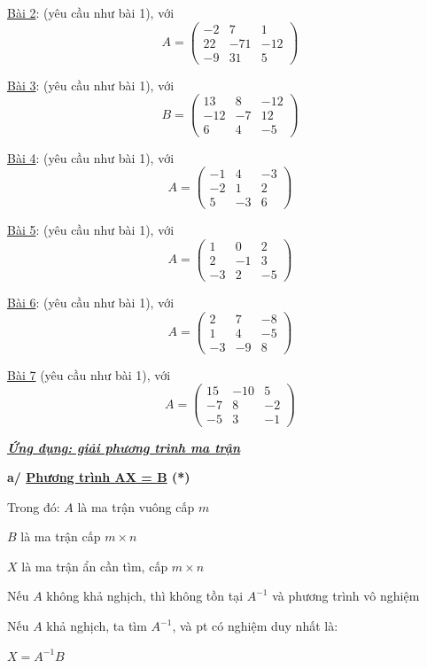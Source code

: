 \documentclass[
]{article}
\let\ul\uline
\begin{document}
\ul{Bài 2}: (yêu cầu như bài 1), với
$$A = \begin{pmatrix} -2 & 7 & 1 \\ 22 & -71 & -12 \\ -9 & 31 & 5 \end{pmatrix}$$

\ul{Bài 3}: (yêu cầu như bài 1), với
$$B = \begin{pmatrix} 13 & 8 & -12 \\ -12 & -7 & 12 \\ 6 & 4 & -5 \end{pmatrix}$$

\ul{Bài 4}: (yêu cầu như bài 1), với
$$A = \begin{pmatrix} -1 & 4 & -3 \\ -2 & 1 & 2 \\ 5 & -3 & 6 \end{pmatrix}$$

\ul{Bài 5}: (yêu cầu như bài 1), với
$$A = \begin{pmatrix} 1 & 0 & 2 \\ 2 & -1 & 3 \\ -3 & 2 & -5 \end{pmatrix}$$

\ul{Bài 6}: (yêu cầu như bài 1), với
$$A = \begin{pmatrix} 2 & 7 & -8 \\ 1 & 4 & -5 \\ -3 & -9 & 8 \end{pmatrix}$$

\ul{Bài 7} (yêu cầu như bài 1), với
$$A = \begin{pmatrix} 15 & -10 & 5 \\ -7 & 8 & -2 \\ -5 & 3 & -1 \end{pmatrix}$$

\emph{\textbf{\ul{Ứng dụng: giải phương trình ma trận}}}

\textbf{a/ \ul{Phương trình AX = B} (*)}

Trong đó: $A$ là ma
trận vuông cấp $m$

$B$ là ma trận cấp
$m \times n$

$X$ là ma trận ẩn
cần tìm, cấp $m \times n$

Nếu
$A$ không khả
nghịch, thì không tồn tại
$A^{-1}$ và phương trình
vô nghiệm

Nếu $A$ khả nghịch,
ta tìm $A^{-1}$, và pt
có nghiệm duy nhất là:

$X = A^{-1}B$
\end{document}
